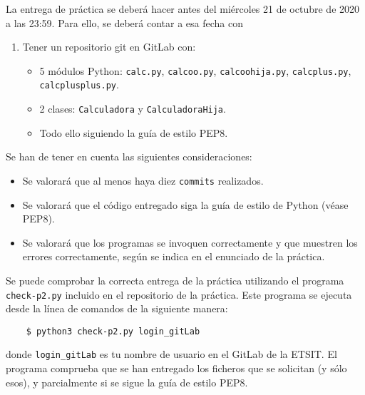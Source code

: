 \documentclass[11pt,a4paper]{article}
\begin{document}
La entrega de práctica se deberá hacer antes del miércoles 21 de octubre de 2020 a las 23:59. Para ello, se deberá contar a esa fecha con


\begin{enumerate}
  \item Tener un repositorio git en GitLab con:
  \begin{itemize}
      \item 5 módulos Python: \texttt{calc.py}, \texttt{calcoo.py}, \texttt{calcoohija.py}, \texttt{calcplus.py}, \texttt{calcplusplus.py}.
      \item 2 clases: \texttt{Calculadora} y \texttt{CalculadoraHija}.
      \item Todo ello siguiendo la guía de estilo PEP8.
  \end{itemize}
\end{enumerate}


Se han de tener en cuenta las siguientes consideraciones:
\begin{itemize}
  \item Se valorará que al menos haya diez \texttt{commits} realizados.
  \item Se valorará que el código entregado siga la guía de estilo de Python (véase PEP8).
  \item Se valorará que los programas se invoquen correctamente y que muestren los errores correctamente, según se indica en el enunciado de la práctica.
\end{itemize}

Se puede comprobar la correcta entrega de la práctica utilizando el programa \texttt{check-p2.py} incluido en el repositorio de la práctica. Este programa se ejecuta desde la línea de comandos de la siguiente manera:
\begin{verbatim}
	$ python3 check-p2.py login_gitLab
\end{verbatim}

donde \texttt{login\_gitLab} es tu nombre de usuario en el GitLab de la ETSIT. El programa comprueba que se han entregado los ficheros que se solicitan (y sólo esos), y parcialmente si se sigue la guía de estilo PEP8.
\end{document}
